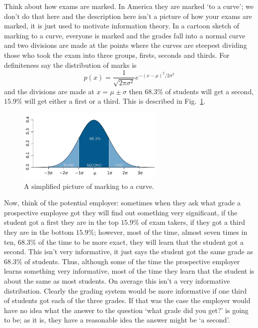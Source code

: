 \documentclass[12pt]{article}
\begin{document}
Think about how exams are marked. In America they are marked \lq{}to a
curve\rq{}; we don't do that here and the description here isn't a
picture of how your exams are marked, it is just used to motivate
information theory. In a cartoon sketch of marking to a curve,
everyone is marked and the grades fall into a normal curve and two
divisions are made at the points where the curves are steepest
dividing those who took the exam into three groups, firsts, seconds
and thirds. For definiteness say the distribution of marks is 
\begin{equation}
p(x)=\frac{1}{\sqrt{2\pi\sigma^2}}e^{-(x-\mu)^2/2\sigma^2}
\end{equation}
and the divisions are made at $x=\mu\pm\sigma$ then $68.3\%$ of
students will get a second, $15.9\%$ will get either a first or a
third. This is described in Fig.~\ref{fig_marking_to_a_curve}.

\begin{figure}
\begin{center}
\includegraphics[width=7cm]{marked_to_curve.png}
\end{center}
\caption{A simplified picture of marking to a curve.\label{fig_marking_to_a_curve}}
\end{figure}

Now, think of the potential employer: sometimes when they ask what
grade a prospective employee got they will find out something very
significant, if the student got a first they are in the top $15.9\%$
of exam takers, if they got a third they are in the bottom $15.9\%$;
however, most of the time, almost seven times in ten, $68.3\%$ of the
time to be more exact, they will learn that the student got a
second. This isn't very informative, it just says the student got the
same grade as $68.3\%$ of students. Thus, although some of the time
the prospective employer learns something very informative, most of
the time they learn that the student is about the same as most
students. On average this isn't a very informative
distribution. Clearly the grading system would be more informative if
one third of students got each of the three grades. If that was the
case the employer would have no idea what the answer to the question
\lq{}what grade did you get?\rq{} is going to be; as it is, they have
a reasonable idea the answer might be \lq{}a second\rq{}.
\end{document}
